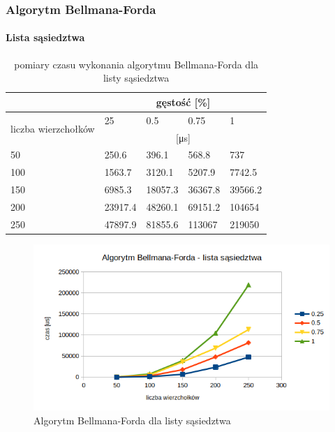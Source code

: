 \documentclass[11pt]{article}
\begin{document}
\subsubsection{Algorytm Bellmana-Forda}
\paragraph{Lista sąsiedztwa}
\begin{table}[H]
    \centering
    \begin{tabular}{|l|llll|}
        \hline
                                             & \multicolumn{4}{c|}{gęstość {[}\%{]}}                                                                         \\ \hline
        \multirow{2}{*}{liczba wierzchołków} & \multicolumn{1}{l|}{25}               & \multicolumn{1}{l|}{0.5}     & \multicolumn{1}{l|}{0.75}    & 1       \\ \cline{2-5}
                                             & \multicolumn{4}{c|}{[μs]}                                                                                     \\ \hline
        50                                   & \multicolumn{1}{l|}{250.6}            & \multicolumn{1}{l|}{396.1}   & \multicolumn{1}{l|}{568.8}   & 737     \\ \hline
        100                                  & \multicolumn{1}{l|}{1563.7}           & \multicolumn{1}{l|}{3120.1}  & \multicolumn{1}{l|}{5207.9}  & 7742.5  \\ \hline
        150                                  & \multicolumn{1}{l|}{6985.3}           & \multicolumn{1}{l|}{18057.3} & \multicolumn{1}{l|}{36367.8} & 39566.2 \\ \hline
        200                                  & \multicolumn{1}{l|}{23917.4}          & \multicolumn{1}{l|}{48260.1} & \multicolumn{1}{l|}{69151.2} & 104654  \\ \hline
        250                                  & \multicolumn{1}{l|}{47897.9}          & \multicolumn{1}{l|}{81855.6} & \multicolumn{1}{l|}{113067}  & 219050  \\ \hline
    \end{tabular}
    \caption{pomiary czasu wykonania algorytmu Bellmana-Forda dla listy sąsiedztwa}
\end{table}

\begin{figure}[H]
    \includegraphics[width=13cm]{images/bellmanlista.png}
    \caption{ Algorytm Bellmana-Forda dla listy sąsiedztwa}
\end{figure}
\end{document}

